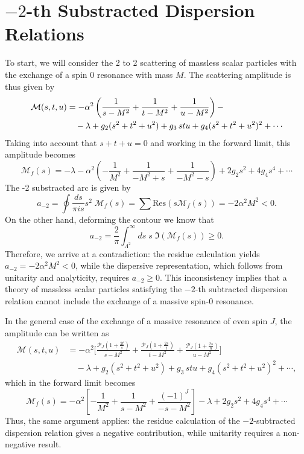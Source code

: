 \section{$-2$-th Substracted Dispersion Relations}
To start, we will consider the 2 to 2 scattering of massless scalar particles with the exchange of a spin 0 resonance with mass $M$. The scattering amplitude is thus given by
\begin{align}
    \mathcal{M}(s, t, u) &= - \alpha^2 \left( \frac{1}{s-M^2} + \frac{1}{t-M^2} + \frac{1}{u -M^2} \right) - \notag \\ &\quad - \lambda
     + g_2(s^2 + t^2 + u^2) + g_3 \, stu + g_4 (s^2 + t^2 + u^2)^2 + \cdots
\end{align}
Taking into account that $s+t+u =0$ and working in the forward limit, this amplitude becomes
\begin{equation}
    \mathcal{M}_f(s) = - \lambda - \alpha^2 \left( - \frac{1}{M^2} + \frac{1}{-M^2 + s} + \frac{1}{-M^2 - s}  \right) + 2 g_2 s^2 + 4 g_4 s^4 + \cdots
\end{equation}
The -2 substracted arc is given by 
\begin{equation}
    a_{-2} = \oint \frac{ds}{\pi i s}s^2 \;\mathcal{M}_f(s) = \sum \text{Res} \left(s \mathcal{M}_f(s) \right) = -2 \alpha^2 M^2 < 0.
\end{equation}
On the other hand, deforming the contour we know that 
\begin{equation}
    a_{-2} = \frac{2}{\pi} \int_{\Lambda^2}^{\infty} ds \; s \; \Im(\mathcal{M}_f(s)) \geq 0.
\end{equation}
Therefore, we arrive at a contradiction: the residue calculation yields \( a_{-2} = - 2 \alpha^2 M^2 < 0 \), while the dispersive representation, which follows from unitarity and analyticity, requires \( a_{-2} \ge 0 \). This inconsistency implies that a theory of massless scalar particles satisfying the \(-2\)-th subtracted dispersion relation cannot include the exchange of a massive spin-0 resonance. 

In the general case of the exchange of a massive resonance of even spin $J$, the amplitude can be written as  
\begin{equation}
    \begin{aligned}
    \mathcal{M}(s,t,u) &= - \alpha^2 \Bigg[ 
    \frac{\mathcal{P}_J\left(1 + \frac{2 t}{s}\right)}{s - M^2} 
    + \frac{\mathcal{P}_J\left(1 + \frac{2 s}{t}\right)}{t - M^2} 
    + \frac{\mathcal{P}_J\left(1 + \frac{2 s}{u}\right)}{u - M^2} 
    \Bigg] \\
    &\quad - \lambda 
    + g_2 (s^2 + t^2 + u^2) 
    + g_3\, s t u 
    + g_4 (s^2 + t^2 + u^2)^2 
    + \cdots,
    \end{aligned}
\end{equation}
which in the forward limit becomes
\begin{equation}
    \mathcal{M}_f(s) = - \alpha^2 \left[- \frac{1}{M^2}+ \frac{1}{s - M^2} + \frac{(-1)^J}{-s - M^2} \right] 
    - \lambda + 2 g_2 s^2 + 4 g_4 s^4 + \cdots
\end{equation}
Thus, the same argument applies: the residue calculation of the $-2$-subtracted dispersion relation gives a negative contribution, while unitarity requires a non-negative result.

